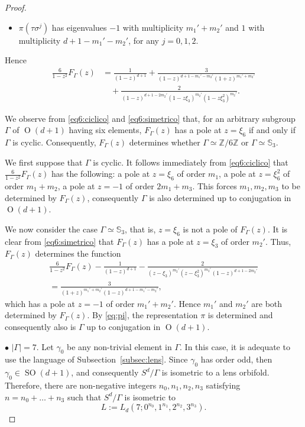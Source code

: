 \documentclass[12pt,a4paper,final]{amsart}
\theoremstyle{plain}
\theoremstyle{definition}
\theoremstyle{remark}
\numberwithin{equation}{section}
\newcommand{\Z}{\mathbb Z}
\DeclareMathOperator{\Ot}{O}
\DeclareMathOperator{\SO}{SO}
\begin{document}
\begin{proof}
\begin{itemize}
\item $\pi(\tau\sigma^j)$ has eigenvalues $-1$ with multiplicity $m_1'+m_2'$ and $1$ with multiplicity $d+1-m_1'-m_2'$, for any $j=0,1,2$. 
\end{itemize}
Hence
\begin{equation}\label{eq6:simetrico}
\begin{aligned}
\frac{6}{1-z^2}F_{\Gamma}(z)&
= \frac{1}{(1-z)^{d+1}}
+\frac{3}{(1-z)^{d+1-m_1'-m_2'} (1+z)^{m_1'+m_2'}}
\\ & \quad
+\frac{2}{(1-z)^{d+1-2m_2'} (1-z\xi_3)^{m_2'} (1-z\xi_3^2)^{m_2'} }
.
\end{aligned}
\end{equation}

We observe from \eqref{eq6:ciclico} and \eqref{eq6:simetrico} that, for an arbitrary subgroup $\Gamma$ of $\Ot(d+1)$ having six elements, $F_{\Gamma}(z)$ has a pole at $z=\xi_6$ if and only if $\Gamma$ is cyclic. 
Consequently, $F_{\Gamma}(z)$ determines whether $\Gamma\simeq\Z/6\Z$ or $\Gamma\simeq \mathbb S_3$. 

We first suppose that $\Gamma$ is cyclic. 
It follows immediately from \eqref{eq6:ciclico} that $\frac{6}{1-z^2} F_{\Gamma}(z)$ has the following: 
a pole at $z=\xi_6$ of order $m_1$, 
a pole at $z=\xi_6^2$ of order $m_1+m_2$, 
a pole at $z=-1$ of order $2m_1+m_3$.
This forces $m_1,m_2,m_3$ to be determined by $F_{\Gamma}(z)$, consequently $\Gamma$ is also determined up to conjugation in $\Ot(d+1)$. 

We now consider the case $\Gamma\simeq\mathbb S_3$, that is, $z=\xi_6$ is not a pole of $F_{\Gamma}(z)$. 
It is clear from \eqref{eq6:simetrico} that $F_{\Gamma}(z)$ has a pole at $z=\xi_3$ of order $m_2'$. 
Thus, $F_{\Gamma}(z)$ determines the function 
\begin{multline*}
\frac{6}{1-z^2}F_{\Gamma}(z)
- \frac{1}{(1-z)^{d+1}}
-
\frac{2}{(z-\xi_3)^{m_2'} (z-\xi_3^2)^{m_2'} (1-z)^{d+1-2m_2'}}
\\ 
=\frac{3}{(1+z)^{m_1'+m_2'}(1-z)^{d+1-m_1'-m_2'}}
,
\end{multline*}
which has a pole at $z=-1$ of order $m_1'+m_2'$.
Hence $m_1'$ and $m_2'$ are both determined by $F_{\Gamma}(z)$. 
By \eqref{eq:pi}, the representation $\pi$ is determined and consequently also is $\Gamma$ up to conjugation in $\Ot(d+1)$. 


\medskip\noindent$\bullet$
$|\Gamma|=7$. 
Let $\gamma_0$ be any non-trivial element in $\Gamma$. 
In this case, it is adequate to use the language of Subsection~\ref{subsec:lens}. 
Since $\gamma_0$ has order odd, then $\gamma_0\in\SO(d+1)$, and consequently $S^{d}/\Gamma$ is isometric to a lens orbifold.
Therefore, there are non-negative integers $n_0,n_1,n_2,n_3$ satisfying $n=n_0+\dots+n_3$ such that $S^d/\Gamma$ is isometric to 
$$
L:=L_d(7;0^{n_0},1^{n_1},2^{n_2},3^{n_3}).
$$





\end{proof}
\end{document}
